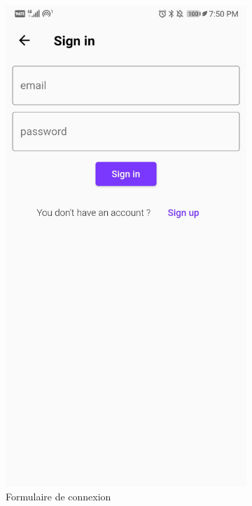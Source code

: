 \begin{appendices}
\begin{landscape}
\begin{figure}[h]
\begin{subfigure}{.25\textwidth}
    \includegraphics[width=.75\linewidth]{content/imgs/screen11.jpg}
    \caption{Formulaire de connexion}
  \end{subfigure}%
  \begin{subfigure}{.25\textwidth}
    \centering

\end{subfigure}
\end{figure}
\end{landscape}
\end{appendices}
